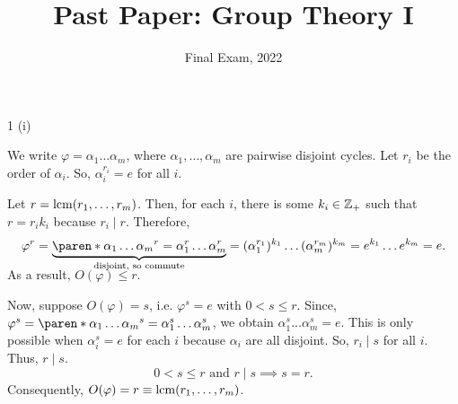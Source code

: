 \documentclass[11pt]{penrose}
\title{Past Paper: Group Theory I}
\subtitle{Final Exam, 2022}
\begin{document}
\maketitle
\warningtext

\begin{problem}{1 (i)}

    We write $\varphi = \alpha_1 \dots \alpha_m$, where $\alpha_1, \dots, \alpha_m$ are pairwise disjoint cycles. Let $r_i$ be the order of $\alpha_i$. So, $\alpha_i^{r_i} = e$ for all $i$.

    Let $r = \operatorname{lcm}(r_1, \dots, r_m)$. Then, for each $i$, there is some $k_i \in \mathbb{Z}_+$ such that $r = r_i k_i$ because $r_i \mid r$. Therefore,
    \begin{equation*}
        \varphi^r
        = \smash[b]{\underbrace{\paren*{\alpha_1 \dots \alpha_m}^r = \alpha_1^r \dots \alpha_m^r}_{\mathclap{\text{disjoint, so commute}}}}
        = (\alpha_1^{r_1})^{k_1} \dots (\alpha_m^{r_m})^{k_m}
        = e^{k_1} \dots e^{k_m}
        = e.
    \end{equation*}

    As a result, $O(\varphi) \leq r$.

    Now, suppose $O(\varphi) = s$, i.e. $\varphi^s = e$ with $0 < s \leq r$. Since, $\varphi^s = \paren*{\alpha_1 \dots \alpha_m}^s = \alpha_1^s \dots \alpha_m^s$, we obtain $\alpha_1^s \dots \alpha_m^s = e$. This is only possible when $\alpha_i^s = e$ for each $i$ because $\alpha_i$ are all disjoint. So, $r_i \mid s$ for all $i$. Thus, $r \mid s$.
    \begin{equation*}
        0 < s \leq r \text{ and } r \mid s \implies s = r.
    \end{equation*}
    Consequently, $O(\varphi) = r \equiv \operatorname{lcm}(r_1, \dots, r_m)$.
\end{problem}
\end{document}
